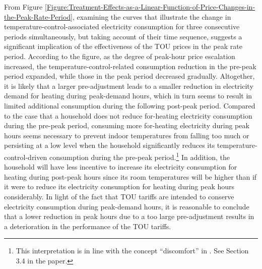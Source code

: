 From Figure \ref{Figure:Treatment-Effects-as-a-Linear-Function-of-Price-Changes-in-the-Peak-Rate-Period}, examining the curves that illustrate the change in temperature-control-associated electricity consumption for three consecutive periods simultaneously, but taking account of their time sequence, suggests a significant implication of the effectiveness of the TOU prices in the peak rate period. According to the figure, as the degree of peak-hour price escalation increased, the temperature-control-related consumption reduction in the pre-peak period expanded, while those in the peak period decreased gradually. Altogether, it is likely that a larger pre-adjustment leads to a smaller reduction in electricity demand for heating during peak-demand hours, which in turn seems to result in limited additional consumption during the following post-peak period. Compared to the case that a household does not reduce for-heating electricity consumption during the pre-peak period, consuming more for-heating electricity during peak hours seems necessary to prevent indoor temperatures from falling too much or persisting at a low level when the household significantly reduces its temperature-control-driven consumption during the pre-peak period.\footnote{This interpretation is in line with the concept ``discomfort'' in \cite{Smart-Thermoststs-Automation-and-Time-Varying-Prices_Blonz-et-al_2021}. See Section 3.4 in the paper.} In addition, the household will have less incentive to increase its electricity consumption for heating during post-peak hours since its room temperatures will be higher than if it were to reduce its electricity consumption for heating during peak hours considerably. In light of the fact that TOU tariffs are intended to conserve electricity consumption during peak-demand hours, it is reasonable to conclude that a lower reduction in peak hours due to a too large pre-adjustment results in a deterioration in the performance of the TOU tariffs. 

